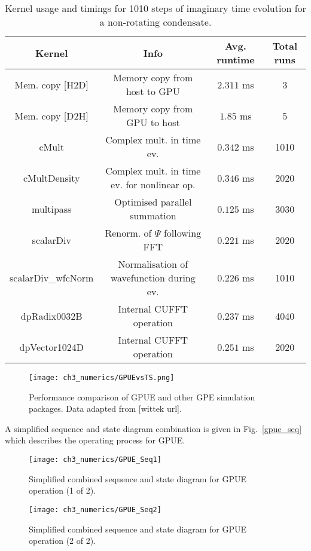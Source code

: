 \begin{table}\label{tbl:gpue_im}
    \small
    \centering
\begin{tabular}{c|c|c|c}
\textbf{Kernel}  & \textbf{Info} & \textbf{Avg. runtime} & \textbf{Total runs} \\
\hline
Mem. copy [H2D] & Memory copy from host to GPU & $2.311$ ms & 3 \\
Mem. copy [D2H] & Memory copy from GPU to host & $1.85$ ms & 5 \\
cMult & Complex mult. in time ev. & $0.342$ ms & 1010 \\
cMultDensity & Complex mult. in time ev. for nonlinear op. & $0.346$ ms & 2020 \\
multipass & Optimised parallel summation & $0.125$ ms & 3030 \\
scalarDiv & Renorm. of $\Psi$ following FFT & $0.221$ ms & 2020 \\
scalarDiv_wfcNorm & Normalisation of wavefunction during ev. & $0.226$ ms & 1010 \\
dpRadix0032B & Internal CUFFT operation & $0.237$ ms & 4040 \\
dpVector1024D & Internal CUFFT operation & $0.251$ ms & 2020 \\
\end{tabular}
\caption{Kernel usage and timings for 1010 steps of imaginary time evolution for a non-rotating condensate.}


\end{table}




\begin{figure}[htb]
    \centering
    \texttt{[image: ch3\_numerics/GPUEvsTS.png]}
    \caption{Performance comparison of GPUE and other GPE simulation packages. Data adapted from [wittek url].}
    \label{fig:gpuevsts}
\end{figure}

A simplified sequence and state diagram combination is given in Fig.~\ref{gpue_seq} which describes the operating process for GPUE.

\begin{figure}[h]
    \centering
        \texttt{[image: ch3\_numerics/GPUE\_Seq1]}
    \caption{Simplified combined sequence and state diagram for GPUE operation (1 of 2).}
    \label{fig:gpue_seq}
\end{figure}
\begin{figure}[h]
    \centering
        \texttt{[image: ch3\_numerics/GPUE\_Seq2]}
    \caption{Simplified combined sequence and state diagram for GPUE operation (2 of 2).}
    \label{fig:gpue_seq}
\end{figure}

